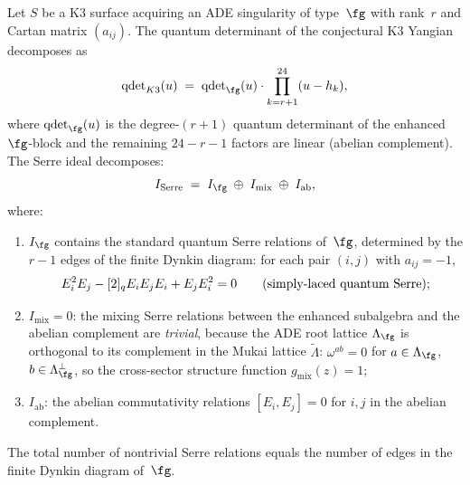 \begin{conjecture}
\label{conj:k3-serre-enhanced}
\ClaimStatusConjectured
Let $S$ be a K3 surface acquiring an ADE singularity of type~$\fg$ with
rank~$r$ and Cartan matrix $(a_{ij})$.
The quantum determinant of the conjectural K3 Yangian decomposes as
\begin{equation}\label{eq:k3-qdet-decomposition}
  \mathrm{qdet}_{K3}(u) \;=\;
  \mathrm{qdet}_{\fg}(u) \cdot \prod_{k=r+1}^{24} (u - h_k),
\end{equation}
where $\mathrm{qdet}_{\fg}(u)$ is the degree-$(r+1)$ quantum determinant
of the enhanced $\fg$-block and the remaining $24 - r - 1$ factors are
linear (abelian complement).  The Serre ideal decomposes:
\begin{equation}\label{eq:k3-serre-decomposition}
  I_{\mathrm{Serre}} \;=\; I_{\fg} \;\oplus\; I_{\mathrm{mix}}
  \;\oplus\; I_{\mathrm{ab}},
\end{equation}
where:
\begin{enumerate}[label=\textup{(\roman*)}]
\item $I_{\fg}$ contains the standard quantum Serre relations of~$\fg$,
 determined by the $r-1$ edges of the finite Dynkin diagram: for each
 pair $(i,j)$ with $a_{ij} = -1$,
 \[
  E_i^2 E_j - [2]_q E_i E_j E_i + E_j E_i^2 = 0
  \qquad \textup{(simply-laced quantum Serre)};
 \]

\item $I_{\mathrm{mix}} = 0$: the mixing Serre relations between the
 enhanced subalgebra and the abelian complement are \emph{trivial},
 because the ADE root lattice $\Lambda_\fg$ is orthogonal to its
 complement in the Mukai lattice $\widetilde{\Lambda}$:
 $\omega^{ab} = 0$ for $a \in \Lambda_\fg$, $b \in \Lambda_\fg^\perp$,
 so the cross-sector structure function $g_{\mathrm{mix}}(z) = 1$;

\item $I_{\mathrm{ab}}$: the abelian commutativity relations
 $[E_i, E_j] = 0$ for $i, j$ in the abelian complement.
\end{enumerate}
The total number of nontrivial Serre relations equals the number of
edges in the finite Dynkin diagram of~$\fg$.
\end{conjecture}

